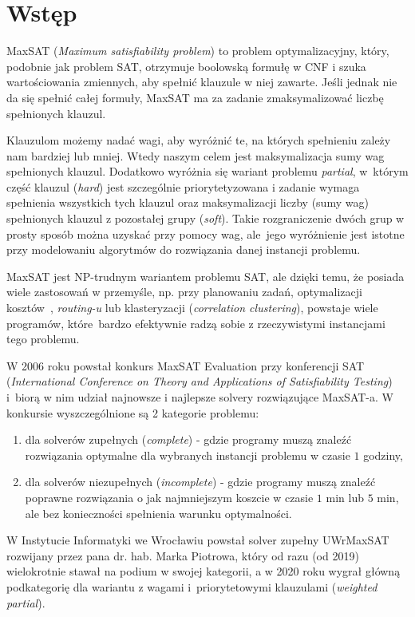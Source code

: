 \documentclass[shortabstract]{iithesis}
\author         {Agnieszka Dudek}
\begin{document}
\chapter{Wstęp}
MaxSAT (\textit{Maximum satisfiability problem}) to problem optymalizacyjny, który, podobnie jak problem SAT, otrzymuje boolowską formułę w CNF i szuka wartościowania zmiennych, aby spełnić klauzule w niej zawarte. Jeśli jednak nie da się spełnić całej formuły, MaxSAT ma za zadanie zmaksymalizować liczbę spełnionych klauzul.

Klauzulom możemy nadać wagi, aby wyróżnić te, na których spełnieniu zależy nam bardziej lub mniej. Wtedy naszym celem jest maksymalizacja sumy wag spełnionych klauzul. 
Dodatkowo wyróżnia się wariant problemu \textit{partial}, w~którym część klauzul (\textit{hard}) jest szczególnie priorytetyzowana i zadanie wymaga spełnienia wszystkich tych klauzul oraz maksymalizacji liczby (sumy wag) spełnionych klauzul z pozostałej grupy (\textit{soft}). Takie rozgraniczenie dwóch grup w prosty sposób można uzyskać przy pomocy wag, ale~jego wyróżnienie jest istotne przy modelowaniu algorytmów do rozwiązania danej instancji problemu.

MaxSAT jest NP-trudnym wariantem problemu SAT, ale dzięki temu, że posiada wiele zastosowań w przemyśle, np. przy planowaniu zadań, optymalizacji kosztów~\cite{optcost}, \textit{routing-u} lub klasteryzacji \cite{clustering} (\textit{correlation clustering}), powstaje wiele programów, które~bardzo efektywnie radzą sobie z rzeczywistymi instancjami tego problemu. 

W 2006 roku powstał konkurs MaxSAT Evaluation \cite{maxsateval} przy konferencji SAT (\textit{International Conference on Theory and Applications of Satisfiability Testing}) i~biorą w nim udział najnowsze i najlepsze solvery rozwiązujące MaxSAT-a.
W konkursie wyszczególnione są 2 kategorie problemu:
\begin{enumerate}
	\item dla solverów zupełnych (\textit{complete}) - gdzie programy muszą znaleźć rozwiązania optymalne dla wybranych instancji problemu w czasie $1$ godziny,
	\item dla solverów niezupełnych (\textit{incomplete}) - gdzie programy muszą znaleźć poprawne rozwiązania o jak najmniejszym koszcie w czasie $1$ min lub $5$ min, ale bez konieczności spełnienia warunku optymalności.
\end{enumerate}

W Instytucie Informatyki we Wrocławiu powstał solver zupełny UWrMaxSAT rozwijany przez pana dr. hab. Marka Piotrowa, który od razu (od 2019) wielokrotnie stawał na podium w swojej kategorii, a w 2020 roku wygrał główną podkategorię dla wariantu z wagami i~priorytetowymi klauzulami (\textit{weighted partial}).
\end{document}
